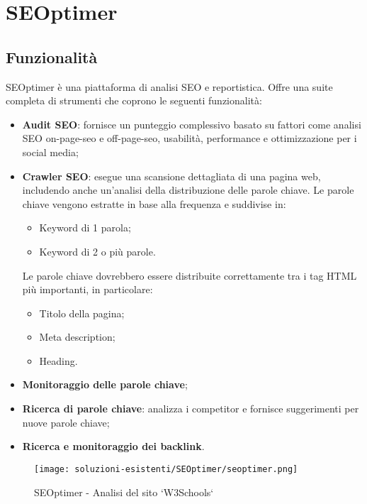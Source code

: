 \section{SEOptimer}

\subsection{Funzionalità}
\par SEOptimer è una piattaforma di analisi SEO e reportistica. Offre una suite completa di strumenti che coprono le seguenti funzionalità:
\begin{itemize}
    \item \textbf{Audit SEO}: fornisce un punteggio complessivo basato su fattori come analisi SEO \gls{on-page-seo} e \gls{off-page-seo}, usabilità, performance e ottimizzazione per i social media;
    \item \textbf{Crawler SEO}: esegue una scansione dettagliata di una pagina web, includendo anche un'analisi della distribuzione delle parole chiave. Le parole chiave vengono estratte in base alla frequenza e suddivise in:
    \begin{itemize}
        \item Keyword di 1 parola;
        \item Keyword di 2 o più parole.
    \end{itemize}
    Le parole chiave dovrebbero essere distribuite correttamente tra i tag HTML più importanti, in particolare: 
    \begin{itemize}
        \item Titolo della pagina;
        \item Meta description;
        \item Heading.
    \end{itemize}
    \item \textbf{Monitoraggio delle parole chiave};
    \item \textbf{Ricerca di parole chiave}: analizza i competitor e fornisce suggerimenti per nuove parole chiave;
    \item \textbf{Ricerca e monitoraggio dei \gls{backlink}}.
\end{itemize}

\begin{figure}[H]
    \centering 
    \texttt{[image: soluzioni-esistenti/SEOptimer/seoptimer.png]} 
    \caption{SEOptimer - Analisi del sito `W3Schools`}
\end{figure}

